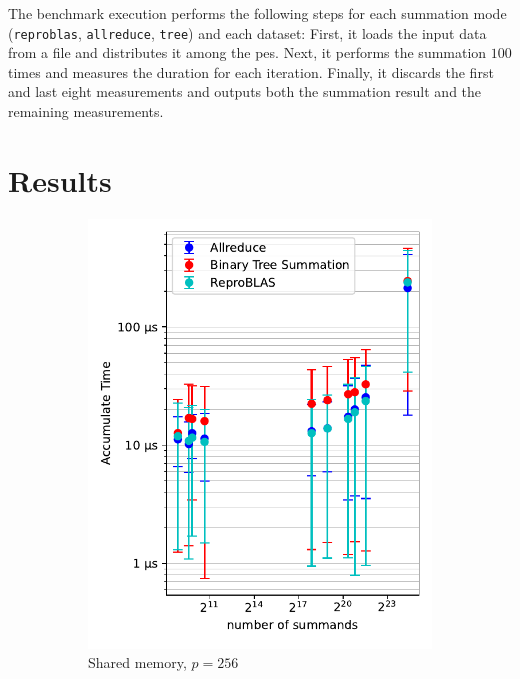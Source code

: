 The benchmark execution performs the following steps for each summation mode (\texttt{reproblas}, \texttt{allreduce}, \texttt{tree}) and each dataset:
First, it loads the input data from a file and distributes it among the \glspl{pe}.
Next, it performs the summation $100$ times and measures the duration for each iteration.
Finally, it discards the first and last eight measurements and outputs both the summation result and the remaining measurements.

\section{Results}
\label{sec:Results}

\begin{figure}
\begin{subfigure}{0.49\textwidth}
\centering
\includegraphics[scale=0.72]{figures/benchmarkScatter.pdf}
\caption{Shared memory, $p=256$}
\label{fig:benchmarkOverview256}
\end{subfigure}
\hfill
\begin{subfigure}{0.49\textwidth}

\end{subfigure}
\end{figure}
